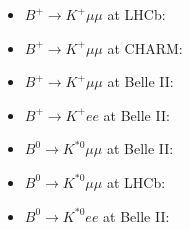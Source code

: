 \documentclass{article}
\begin{document}
\begin{itemize}
\item $B^+ \to K^+ \mu \mu$ at LHCb: \cite{LHCb:2016awg}
\item $B^+ \to K^+ \mu \mu$ at CHARM: \cite{Dobrich:2018jyi,CHARM:1985anb}
\item $B^+ \to K^+ \mu \mu$ at Belle II: \cite{Belle-II:2023ueh}
\item $B^+ \to K^+ e e$ at Belle II: \cite{Belle-II:2023ueh}
\item $B^0 \to K^{*0} \mu \mu$ at Belle II: \cite{Belle-II:2023ueh}
\item $B^0 \to K^{*0} \mu \mu$ at LHCb: \cite{LHCb:2015nkv}
\item $B^0 \to K^{*0} e e$ at Belle II: \cite{Belle-II:2023ueh}
\end{itemize}


\end{document}
